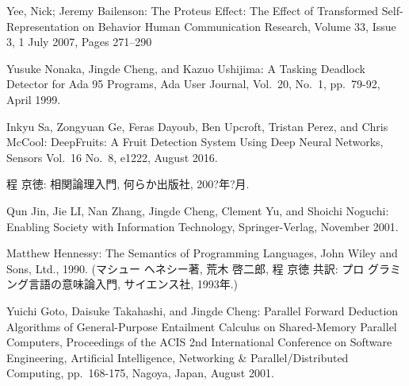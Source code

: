 \documentclass[12pt,dvipdfmx]{jreport}
\begin{document}
\begin{thebibliography}{99}
\label{sannkoubunnkenn_chapter}

%


Yee, Nick; Jeremy Bailenson: The Proteus Effect: The Effect of Transformed Self-Representation on Behavior Human Communication Research, Volume 33, Issue 3, 1 July 2007, Pages 271–290


Yusuke Nonaka, Jingde Cheng, and Kazuo Ushijima: A Tasking Deadlock
        Detector for Ada 95 Programs, Ada User Journal, Vol.\ 20, No.\ 1,
        pp.\ 79-92, April 1999.

        Inkyu Sa, Zongyuan Ge, Feras Dayoub, Ben Upcroft, Tristan Perez, and Chris McCool: DeepFruits: A Fruit Detection System Using Deep Neural Networks, Sensors Vol.\ 16 No.\ 8, e1222, August 2016.


程 京徳: 相関論理入門, 何らか出版社, 200?年?月.

Qun Jin, Jie LI, Nan Zhang, Jingde Cheng, Clement Yu, and Shoichi
        Noguchi: Enabling Society with Information Technology,
        Springer-Verlag, November 2001.

Matthew Hennessy: The Semantics of Programming Languages, John Wiley and
Sons, Ltd., 1990. (マシュー ヘネシー著, 荒木 啓二郎, 程 京徳 共訳: プロ
グラミング言語の意味論入門, サイエンス社, 1993年.)

Yuichi Goto, Daisuke Takahashi, and Jingde Cheng: Parallel Forward
        Deduction Algorithms of General-Purpose Entailment Calculus on
        Shared-Memory Parallel Computers, Proceedings of the ACIS 2nd
        International Conference on Software Engineering, Artificial
        Intelligence, Networking \& Parallel/Distributed Computing,
        pp.\ 168-175, Nagoya, Japan, August 2001.


\end{thebibliography}
\end{document}
